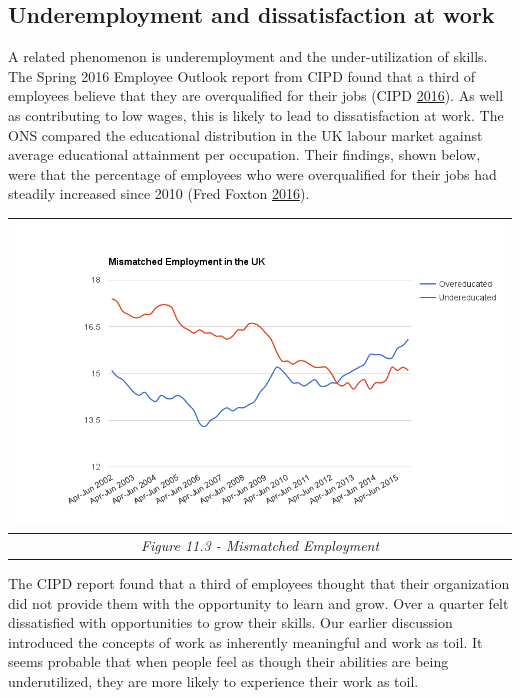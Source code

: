 \documentclass[]{tufte-handout}
\begin{document}
\hypertarget{underemployment-and-dissatisfaction-at-work}{%
\subsection{Underemployment and dissatisfaction at
work}\label{underemployment-and-dissatisfaction-at-work}}

A related phenomenon is underemployment and the under-utilization of
skills. The Spring 2016 Employee Outlook report from CIPD found that a
third of employees believe that they are overqualified for their jobs
(CIPD \protect\hyperlink{ref-CIPD2016}{2016}). As well as contributing
to low wages, this is likely to lead to dissatisfaction at work. The ONS
compared the educational distribution in the UK labour market against
average educational attainment per occupation. Their findings, shown
below, were that the percentage of employees who were overqualified for
their jobs had steadily increased since 2010 (Fred Foxton
\protect\hyperlink{ref-FredFoxton2016}{2016}).

\begin{longtable}[]{@{}c@{}}
\toprule
\includegraphics{ChapterPictures/11-3-MismatchedEmployment.png}\tabularnewline
\midrule
\endhead
\emph{Figure 11.3 - Mismatched Employment }\tabularnewline
\bottomrule
\end{longtable}

The CIPD report found that a third of employees thought that their
organization did not provide them with the opportunity to learn and
grow. Over a quarter felt dissatisfied with opportunities to grow their
skills. Our earlier discussion introduced the concepts of work as
inherently meaningful and work as toil. It seems probable that when
people feel as though their abilities are being underutilized, they are
more likely to experience their work as toil.
\end{document}
